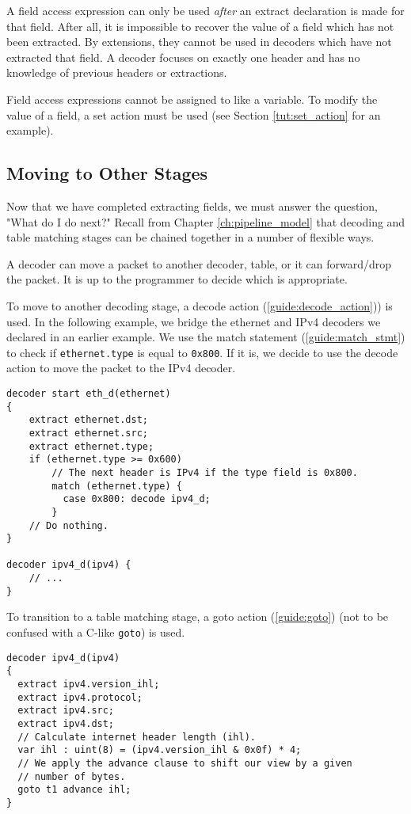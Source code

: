 A field access expression can only be used \textit{after} an extract declaration is made for that field. After all, it is impossible to recover the value of a field which has not been extracted. By extensions, they cannot be used in decoders which have not extracted that field. A decoder focuses on exactly one header and has no knowledge of previous headers or extractions. 

Field access expressions cannot be assigned to like a variable. To modify the value of a field, a set action must be used (see Section \ref{tut:set_action} for an example).

\subsection{Moving to Other Stages} \label{tut:decoder_next}

Now that we have completed extracting fields, we must answer the question, "What do I do next?" Recall from Chapter \ref{ch:pipeline_model} that decoding and table matching stages can be chained together in a number of flexible ways. 

A decoder can move a packet to another decoder, table, or it can forward/drop the packet. It is up to the programmer to decide which is appropriate.

To move to another decoding stage, a decode action (\ref{guide:decode_action})) is used. In the following example, we bridge the ethernet and IPv4 decoders we declared in an earlier example. We use the match statement (\ref{guide:match_stmt}) to check if \texttt{ethernet.type} is equal to \texttt{0x800}. If it is, we decide to use the decode action to move the packet to the IPv4 decoder.

\begin{codepage}
\begin{lstlisting}
decoder start eth_d(ethernet)
{
	extract ethernet.dst;
	extract ethernet.src;
	extract ethernet.type;
	if (ethernet.type >= 0x600)
	  	// The next header is IPv4 if the type field is 0x800.
	    match (ethernet.type) {
	      case 0x800: decode ipv4_d;
	    }
	// Do nothing.
}

decoder ipv4_d(ipv4) {
	// ...
}
\end{lstlisting}
\end{codepage}

To transition to a table matching stage, a goto action (\ref{guide:goto}) (not to be confused with a C-like \texttt{goto}) is used. 

\begin{codepage}
\begin{lstlisting}
decoder ipv4_d(ipv4)
{
  extract ipv4.version_ihl;
  extract ipv4.protocol;
  extract ipv4.src;
  extract ipv4.dst;
  // Calculate internet header length (ihl).
  var ihl : uint(8) = (ipv4.version_ihl & 0x0f) * 4;
  // We apply the advance clause to shift our view by a given
  // number of bytes.
  goto t1 advance ihl;
}
\end{lstlisting}
\end{codepage}

